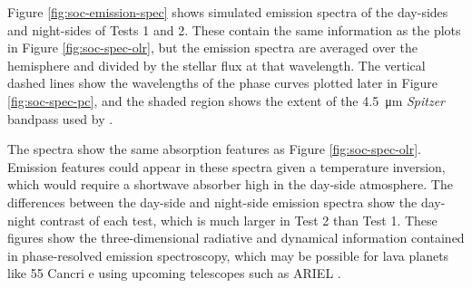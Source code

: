 Figure \ref{fig:soc-emission-spec} shows simulated emission spectra of the day-sides and night-sides of Tests 1 and 2. These contain the same information as the plots in Figure \ref{fig:soc-spec-olr}, but the emission spectra are averaged over the hemisphere and divided by the stellar flux at that wavelength. The vertical dashed lines show the wavelengths of the phase curves plotted later in Figure \ref{fig:soc-spec-pc}, and the shaded region shows the extent of the \SI{4.5}{\micro\metre} \textit{Spitzer} bandpass used by \citet{demory201655cnce}.

The spectra show the same absorption features as Figure \ref{fig:soc-spec-olr}. Emission features could appear in these spectra given a temperature inversion, which would require a shortwave absorber high in the day-side atmosphere. The differences between the day-side and night-side emission spectra show the day-night contrast of each test, which is much larger in Test 2 than Test 1. These figures show the three-dimensional radiative and dynamical information contained in phase-resolved emission spectroscopy, which may be possible for lava planets like 55 Cancri e using upcoming telescopes such as ARIEL \citep{stevenson2014thermal, tinetti2016ariel}.




